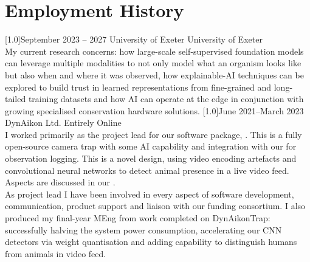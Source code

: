 \documentclass[a4paper]{cv-style}     %
\begin{document}
\section{Employment History}
  \vspace{-0.4cm}
  
\begin{entrylist}
\entry
{\scalebox{.8}[1.0]{September 2023 -- 2027}}
  {University of Exeter}
  {University of Exeter}
  {\\
  My current research concerns: how large-scale self-supervised foundation models can leverage multiple modalities to not only model what an organism looks like but also when and where it was observed, how explainable-AI techniques can be explored to build trust in learned representations from fine-grained and long-tailed training datasets and how AI can operate at the edge in conjunction with growing specialised conservation hardware solutions.
  }
\entry
  {\scalebox{.8}[1.0]{June 2021--March 2023}}
  {DynAikon Ltd.}
  {Entirely Online}
  {\\
  I worked primarily as the project lead for our software package, . This is a fully open-source camera trap with some AI capability and integration with our  for observation logging. This is a novel design, using video encoding artefacts and convolutional neural networks to detect animal presence in a live video feed. Aspects are discussed in our . 
  \\
  As project lead I have been involved in every aspect of software development, communication, product support and liaison with our funding consortium. I also produced my final-year MEng  from work completed on DynAikonTrap: successfully halving the system power consumption, accelerating our CNN detectors via weight quantisation and adding capability to distinguish humans from animals in video feed. 
}
\end{entrylist}
\end{document}

